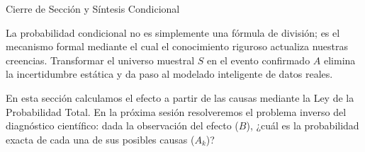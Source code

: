 \documentclass[10pt,aspectratio=169]{beamer}
\begin{document}
\begin{frame}{Cierre de Sección y Síntesis Condicional}
  \begin{reflexion}
    La probabilidad condicional no es simplemente una fórmula de división; es el mecanismo formal mediante el cual el conocimiento riguroso actualiza nuestras creencias. Transformar el universo muestral $S$ en el evento confirmado $A$ elimina la incertidumbre estática y da paso al modelado inteligente de datos reales.
  \end{reflexion}

  \vspace{0.5em}
  \pause
  \begin{retoclase}
    En esta sección calculamos el efecto a partir de las causas mediante la Ley de la Probabilidad Total. En la próxima sesión resolveremos el problema inverso del diagnóstico científico: dada la observación del efecto ($B$), ¿cuál es la probabilidad exacta de cada una de sus posibles causas ($A_k$)?
  \end{retoclase}
\end{frame}
\end{document}
